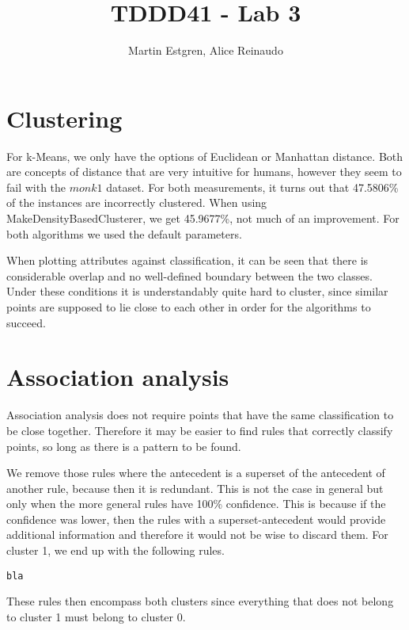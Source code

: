\documentclass[]{article}
\title{TDDD41 - Lab 3}
\author{Martin Estgren, Alice Reinaudo}
\begin{document}
\maketitle

\section{Clustering}
For k-Means, we only have the options of Euclidean or Manhattan distance. Both are concepts of distance that are very intuitive for humans, however they seem to fail with the $monk1$ dataset. For both measurements, it turns out that 47.5806\% of the instances are incorrectly clustered. When using MakeDensityBasedClusterer, we get 45.9677\%, not much of an improvement. For both algorithms we used the default parameters.

When plotting attributes against classification, it can be seen that there is considerable overlap and no well-defined boundary between the two classes. Under these conditions it is understandably quite hard to cluster, since similar points are supposed to lie close to each other in order for the algorithms to succeed.



\section{Association analysis}
Association analysis does not require points that have the same classification to be close together. Therefore it may be easier to find rules that correctly classify points, so long as there is a pattern to be found.

We remove those rules where the antecedent is a superset of the antecedent of another rule, because then it is redundant. This is not the case in general but only when the more general rules have 100\% confidence. This is because if the confidence was lower, then the rules with a superset-antecedent would provide additional information and therefore it would not be wise to discard them. For cluster 1, we end up with the following rules.

\begin{lstlisting}
bla
\end{lstlisting}

These rules then encompass both clusters since everything that does not belong to cluster 1 must belong to cluster 0.
\end{document}
